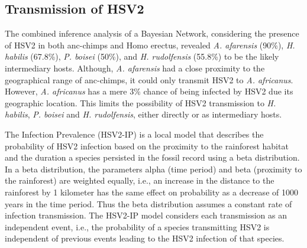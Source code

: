 \documentclass[fleqn,10pt]{wlscirep}
\begin{document}
\subsection*{Transmission of HSV2}
The combined inference analysis of a Bayesian Network, considering the presence of HSV2 in both anc-chimps and Homo erectus, revealed \textit{A. afarensis} (90\%), \textit{H. habilis} (67.8\%), \textit{P. boisei}  (50\%), and \textit{H. rudolfensis} (55.8\%) to be the likely intermediary hosts. Although, \textit{A. afarensis} had a close proximity to the geographical range of anc-chimps, it could only transmit HSV2 to \textit{A. africanus}. However, \textit{A. africanus} has a mere 3\% chance of being infected by HSV2 due its geographic location. This limits the possibility of HSV2 transmission to \textit{H. habilis}, \textit{P. boisei} and \textit{H. rudolfensis}, either directly or as intermediary hosts. 

The Infection Prevalence (HSV2-IP) is a local model that describes the probability of HSV2 infection based on the proximity to the rainforest habitat and the duration a species persisted in the fossil record using a beta distribution. In a beta distribution, the parameters alpha (time period) and beta (proximity to the rainforest) are weighted equally, i.e., an increase in the distance to the rainforest by 1 kilometer has the same effect on probability as a decrease of 1000 years in the time period. Thus the beta distribution assumes a constant rate of infection transmission. The HSV2-IP model considers each transmission as an independent event, i.e., the probability of a species transmitting HSV2 is independent of previous events leading to the HSV2 infection of that species. 
\end{document}
